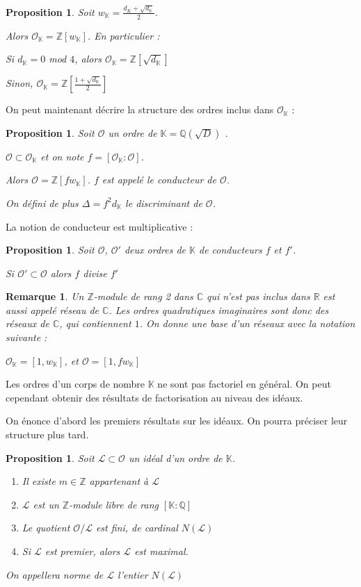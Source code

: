 \documentclass{article}
\newcommand{\Z}[0]{\mathbb{Z}}
\newcommand{\Q}[0]{\mathbb{Q}}
\newcommand{\R}[0]{\mathbb{R}}
\newcommand{\C}[0]{\mathbb{C}}
\newcommand{\K}[0]{\mathbb{K}}
\newcommand{\OR}[0]{\mathcal{O}}
\newcommand{\LR}[0]{\mathcal{L}}
\newtheorem{Prop}[The]{Proposition}
\newtheorem{Rem}[The]{Remarque}
\begin{document}
\begin{Prop}
	Soit $w_{\K} = \frac{d_{K} + \sqrt{d_{\K}}}{2}$.
	
	Alors $\OR_{\K} = \Z\left[ w_{\K}\right] $. En particulier :
	
	Si $d_{\K} = 0$ mod $4$, alors $\OR_{\K} = \Z\left[ \sqrt{d_{\K}}\right] $
	
	Sinon, $\OR_{\K} = \Z\left[ \frac{1 + \sqrt{d_{\K}}}{2}\right] $
\end{Prop}

On peut maintenant décrire la structure des ordres inclus dans $\OR_{\K}$ :

\begin{Prop}
	Soit $\OR$ un ordre de $\K = \Q(\sqrt{D})$ .
	
	 $\OR\subset\OR_{\K}$ et on note $f = \left[ \OR_{\K} : \OR\right]$.
	
	Alors $\OR = \Z\left[ fw_{\K}\right] $. $f$ est appelé le conducteur de $\OR$. 
	
	On défini de plus $\Delta = f^2d_{\K}$ le discriminant de $\OR$. 
\end{Prop}

La notion de conducteur est multiplicative :

\begin{Prop}
	Soit $\OR$, $\OR'$ deux ordres de $\K$ de conducteurs $f$ et $f'$.
	
	Si $\OR'\subset\OR$ alors $f$ divise $f'$
\end{Prop}

\begin{Rem}
	Un $\Z$-module de rang 2 dans $\C$ qui n'est pas inclus dans $\R$ est aussi appelé réseau de $\C$. Les ordres quadratiques imaginaires sont donc des réseaux de $\C$, qui contiennent $1$. 
	On donne une base d'un réseaux avec la notation suivante :
	
	$\OR_{\K} = \left[1 , w_{\K}\right]$, et $\OR = \left[ 1, fw_{\K}\right]$
\end{Rem}

Les ordres d'un corps de nombre $\K$ ne sont pas factoriel en général. On peut cependant obtenir des résultats de factorisation au niveau des idéaux.

On énonce d'abord les premiers résultats sur les idéaux. On pourra préciser leur structure plus tard.

\begin{Prop}
	
	Soit $\LR\subset\OR$ un idéal d'un ordre de $\K$.
	
	\begin{enumerate}
		\item Il existe $m\in\Z$ appartenant à $\LR$
		\item $\LR$ est un $\Z$-module libre de rang $\left[ \K : \Q\right] $
		\item Le quotient $\OR/\LR$ est fini, de cardinal $N(\LR)$
		\item Si $\LR$ est premier, alors $\LR$ est maximal. 
	\end{enumerate}
	
	On appellera norme de $\LR$ l'entier $N(\LR)$
	
\end{Prop}
\end{document}
